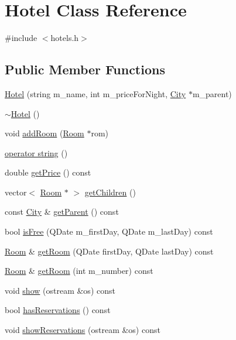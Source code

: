 \hypertarget{class_hotel}{}\section{Hotel Class Reference}
\label{class_hotel}


{\ttfamily \#include $<$hotels.\+h$>$}

\subsection*{Public Member Functions}
\begin{DoxyCompactItemize}
\item 
\hyperlink{class_hotel_aa74ecd8c4a1b959628d28779efb00c46}{Hotel} (string m\+\_\+name, int m\+\_\+price\+For\+Night, \hyperlink{class_city}{City} $\ast$m\+\_\+parent)
\item 
\hyperlink{class_hotel_ae4c9782535c021bc10c028339dc29310}{$\sim$\+Hotel} ()
\item 
void \hyperlink{class_hotel_a81dd1c4ed4589770fad50517688035a1}{add\+Room} (\hyperlink{class_room}{Room} $\ast$rom)
\item 
\hyperlink{class_hotel_a8528cf910b707df791daed38519c895e}{operator string} ()
\item 
double \hyperlink{class_hotel_a0c9a17ff69bb3ecec9e8938b8532defa}{get\+Price} () const
\item 
vector$<$ \hyperlink{class_room}{Room} $\ast$ $>$ \hyperlink{class_hotel_a1e22ca2270cf28ea4b03497701d970a1}{get\+Children} ()
\item 
const \hyperlink{class_city}{City} \& \hyperlink{class_hotel_a10b09b0e1309de50bc7cc6ebafb822af}{get\+Parent} () const
\item 
bool \hyperlink{class_hotel_aa11ad566c8765362795e53f4088e10d7}{is\+Free} (Q\+Date m\+\_\+first\+Day, Q\+Date m\+\_\+last\+Day) const
\item 
\hyperlink{class_room}{Room} \& \hyperlink{class_hotel_ac836a89654a7561169ca1523f0365861}{get\+Room} (Q\+Date first\+Day, Q\+Date last\+Day) const
\item 
\hyperlink{class_room}{Room} \& \hyperlink{class_hotel_a5188fb61eb6bd1fa3e971f2457c50947}{get\+Room} (int m\+\_\+number) const
\item 
void \hyperlink{class_hotel_a78710e2a296cf886845a7fe39b9b9ddb}{show} (ostream \&os) const
\item 
bool \hyperlink{class_hotel_a05e576bdd914079ceb0781323408014b}{has\+Reservations} () const
\item 
void \hyperlink{class_hotel_abbae1165abd672d1568cd3dcec64000e}{show\+Reservations} (ostream \&os) const
\end{DoxyCompactItemize}


